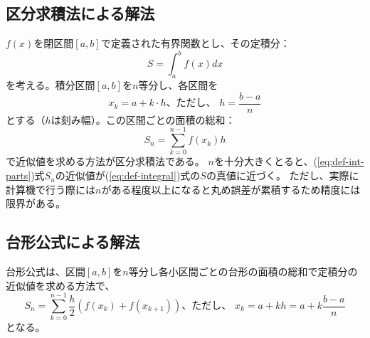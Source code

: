 \documentclass[12pt,a4paper]{ltjsreport}
\begin{document}
\subsection{区分求積法による解法}
$f(x)$を閉区間$[a, b]$で定義された有界関数とし、その定積分：
\begin{equation}\label{eq:def-integral}
S = \int_{a}^{b}f(x)dx
\end{equation}
を考える。積分区間$[a,b]$を$n$等分し、各区間を
\begin{equation}
x_k = a + k \cdot h\text{、ただし、 } h = \frac{b-a}{n}
\end{equation}
とする（$h$は刻み幅）。この区間ごとの面積の総和：
\begin{equation}\label{eq:def-int-parts}
S_n = \sum_{k=0}^{n-1}f(x_k)h
\end{equation}
で近似値を求める方法が区分求積法である。
$n$を十分大きくとると、(\ref{eq:def-int-parts})式$S_n$の近似値が(\ref{eq:def-integral})式の$S$の真値に近づく。
ただし、実際に計算機で行う際には$n$がある程度以上になると丸め誤差が累積するため精度には限界がある。

\subsection{台形公式による解法}
台形公式は、区間$[a,b]$を$n$等分し各小区間ごとの台形の面積の総和で定積分の近似値を求める方法で、
\begin{equation}
S_n = \sum_{k=0}^{n-1}\frac{h}{2}(f(x_k)+f(x_{k+1}))\text{、ただし、 } x_k = a + kh = a + k\frac{b-a}{n}
\end{equation}
となる。
\end{document}
